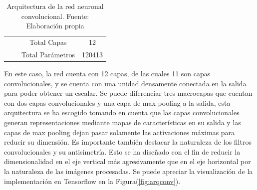 \begin{table}[!h]
{\begin{tabular}{@{}cccccc@{}}
                                                    & \multicolumn{1}{c|}{}              & \multicolumn{2}{c|}{Total Capas}                                                                                                                                                            & \multicolumn{2}{c|}{12}                                                                                                                                                                          \\ \cmidrule(l){3-6} 
                                                    & \multicolumn{1}{c|}{}              & \multicolumn{2}{c|}{Total Parámetros}                                                                                                                                                       & \multicolumn{2}{c|}{120413}                                                                                                                                                                      \\ \cmidrule(l){3-6} 
            \end{tabular}%
            }
            \caption[Arquitectura de la red neuronal convolucional.]{Arquitectura de la red neuronal convolucional. Fuente: Elaboración propia}
            \label{tbl:arqconv}
        \end{table}

        En este caso, la red cuenta con 12 capas, de las cuales 11 son capas convolucionales, y se cuenta con una unidad densamente
        conectada en la salida para poder obtener un escalar. Se puede diferenciar tres macrocapas que cuentan con dos capas 
        convolucionales y una capa de max pooling a la salida, esta arquitectura se ha escogido tomando en cuenta que 
        las capas convolucionales generan representaciones mediante mapas de características en su salida y las capas de max pooling 
        dejan pasar solamente las activaciones máximas para reducir su dimensión. Es importante también destacar la naturaleza 
        de los filtros convolucionales y su antisimetría. Esto se ha diseñado con el fin de reducir la dimensionalidad en el 
        eje vertical más agresivamente que en el eje horizontal por la naturaleza de las imágenes procesadas. Se puede apreciar 
        la visualización de la implementación en Tensorflow en la Figura(\ref{fig:arqconv}).

